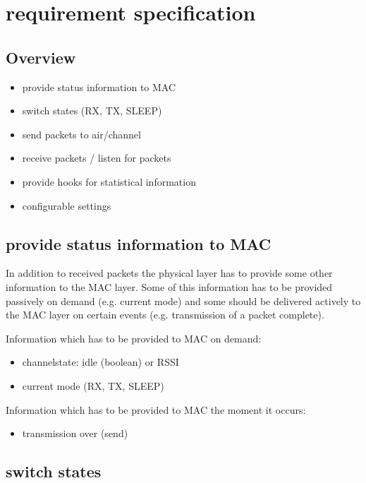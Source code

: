 \section{requirement specification}

\subsection{Overview}

\begin{itemize}
 \item provide status information to MAC
 \item switch states (RX, TX, SLEEP)
 \item send packets to air/channel
 \item receive packets / listen for packets
 \item provide hooks for statistical information
 \item configurable settings
\end{itemize}

\subsection{provide status information to MAC}

In addition to received packets the physical layer has to provide some other information to the MAC layer.
Some of this information has to be provided passively on demand (e.g. current mode) and some should be delivered actively to the MAC layer on certain events (e.g. transmission of a packet complete).

\noindent Information which has to be provided to MAC on demand:
\begin{itemize}
 \item channelstate: idle (boolean) or RSSI
 \item current mode (RX, TX, SLEEP)
\end{itemize}

\noindent Information which has to be provided to MAC the moment it occurs:
\begin{itemize}
 \item transmission over (send)
\end{itemize}

\pagebreak
\subsection{switch states}

